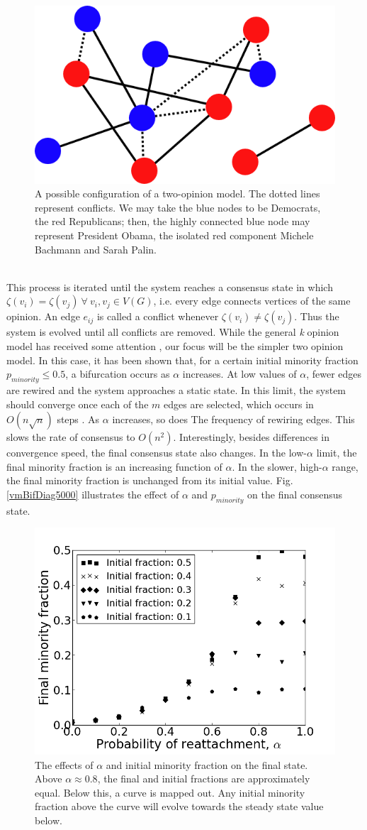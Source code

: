 \documentclass[11pt]{article}
\begin{document}
\begin{figure}[h!]
  \centering
  \includegraphics[width=.5\linewidth]{votingModel}
  \caption{A possible configuration of a two-opinion model. The dotted lines represent conflicts. We may take the blue nodes to be Democrats, the red Republicans; then, the highly connected blue node may represent President Obama, the isolated red component Michele Bachmann and Sarah Palin.}
  \label{fig:graphA}
\end{figure}
\\
This process is iterated until the system reaches a consensus state in which $\zeta(v_{i}) = \zeta(v_{j}) \ \forall \ v_{i}, v_{j} \in V(G)$, i.e. every edge connects vertices of the same opinion. An edge $e_{ij}$ is called a conflict whenever $\zeta(v_{i}) \ne \zeta(v_{j})$. Thus the system is evolved until all conflicts are removed. While the general \textit{k} opinion model has received some attention \cite{Shi}, our focus will be the simpler two opinion model. In this case, it has been shown that, for a certain initial minority fraction $p_{minority} \le 0.5$, a bifurcation occurs as $\alpha$ increases. At low values of $\alpha$, fewer edges are rewired and the system approaches a static state. In this limit, the system should converge once each of the $m$ edges are selected, which occurs in $O(n\sqrt{n})$ steps  \cite{Durrett2012}. As $\alpha$ increases, so does The frequency of rewiring edges. This slows the rate of consensus to $O(n^{2})$. Interestingly, besides differences in convergence speed, the final consensus state also changes. In the low-$\alpha$ limit, the final minority fraction is an increasing function of $\alpha$. In the slower, high-$\alpha$ range, the final minority fraction is unchanged from its initial value. Fig. \ref{vmBifDiag5000} illustrates the effect of $\alpha$ and $p_{minority}$ on the final consensus state.\vspace{1mm}
\begin{figure}[h!]
  \centering
  \includegraphics[width=.5\linewidth]{vmBifDiag5000}
  \caption{The effects of $\alpha$ and initial minority fraction on the final state. Above $\alpha \approx 0.8$, the final and initial fractions are approximately equal. Below this, a curve is mapped out. Any initial minority fraction above the curve will evolve towards the steady state value below.}
  \label{fig:vmBifDiag5000}
\end{figure}
\end{document}
